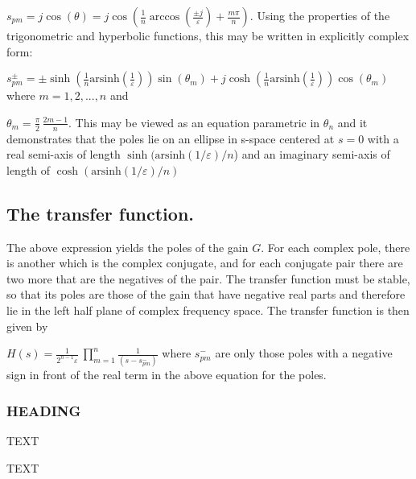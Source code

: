 \documentclass[journal abbreviation, manuscript]{copernicus}
\begin{document}
$s_{pm}=j\cos(\theta)=j\cos\left(\frac{1}{n}\arccos\left(\frac{\pm j}{\varepsilon}\right)+\frac{m\pi}{n}\right).$
Using the properties of the trigonometric and hyperbolic functions, this may be written in explicitly complex form:

$s_{pm}^\pm=\pm \sinh\left(\frac{1}{n}\mathrm{arsinh}\left(\frac{1}{\varepsilon}\right)\right)\sin(\theta_m)+j  \cosh\left(\frac{1}{n}\mathrm{arsinh}\left(\frac{1}{\varepsilon}\right)\right)\cos(\theta_m)$
where $m = 1, 2,..., n$  and

$\theta_m=\frac{\pi}{2}\,\frac{2m-1}{n}$.
This may be viewed as an equation parametric in $\theta_n$ and it demonstrates that the poles lie on an ellipse in s-space centered at $s = 0$ with a real semi-axis of length $\sinh(\mathrm{arsinh}(1/\varepsilon)/n$) and an imaginary semi-axis of length of $\cosh(\mathrm{arsinh}(1/\varepsilon)/n)$
\subsection{The transfer function.}
The above expression yields the poles of the gain $G$. For each complex pole, there is another which is the complex conjugate, and for each conjugate pair there are two more that are the negatives of the pair. The transfer function must be stable, so that its poles are those of the gain that have negative real parts and therefore lie in the left half plane of complex frequency space. The transfer function is then given by

$H(s)= \frac{1}{2^{n-1}\varepsilon}\ \prod_{m=1}^{n} \frac{1}{(s-s_{pm}^-)}$
where $s_{pm}^-$ are only those poles with a negative sign in front of the real term in the above equation for the poles.

\subsubsection{HEADING}
TEXT




\conclusions  %
TEXT




\appendix
\section{}    %

\subsection{}                               %
\end{document}
